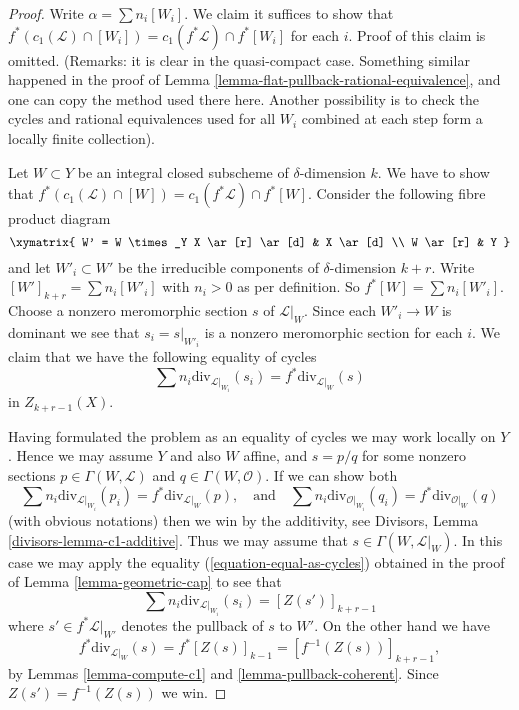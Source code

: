 \begin{proof}
Write $\alpha = \sum n_i[W_i]$. We claim it suffices to show that
$f^*(c_1(\mathcal{L}) \cap [W_i]) = c_1(f^*\mathcal{L}) \cap f^*[W_i]$
for each $i$. Proof of this claim is omitted.
(Remarks: it is clear in the quasi-compact case.
Something similar happened in the proof of
Lemma \ref{lemma-flat-pullback-rational-equivalence}, and one
can copy the method used there here. Another possibility
is to check the cycles and rational equivalences used
for all $W_i$ combined at each step form a locally finite collection).

\medskip\noindent
Let $W \subset Y$ be an integral closed subscheme of $\delta$-dimension $k$.
We have to show that
$f^*(c_1(\mathcal{L}) \cap [W]) = c_1(f^*\mathcal{L}) \cap f^*[W]$.
Consider the following fibre product diagram
$$
\xymatrix{
W' = W \times_Y X \ar[r] \ar[d] & X \ar[d] \\
W \ar[r] & Y
}
$$
and let $W'_i \subset W'$ be the irreducible components of
$\delta$-dimension $k + r$. Write
$[W']_{k + r} = \sum n_i[W'_i]$ with $n_i > 0$ as per definition.
So $f^*[W] = \sum n_i[W'_i]$. Choose a nonzero meromorphic section
$s$ of $\mathcal{L}|_W$. Since each $W'_i \to W$ is dominant we
see that $s_i = s|_{W'_i}$ is a nonzero meromorphic section for
each $i$. We claim that we have the following equality of
cycles
$$
\sum n_i\text{div}_{\mathcal{L}|_{W_i}}(s_i)
=
f^*\text{div}_{\mathcal{L}|_W}(s)
$$
in $Z_{k + r - 1}(X)$.

\medskip\noindent
Having formulated the problem as an equality of cycles
we may work locally on $Y$. Hence we may assume
$Y$ and also $W$ affine, and $s = p/q$ for some
nonzero sections $p \in \Gamma(W, \mathcal{L})$
and $q \in \Gamma(W, \mathcal{O})$. If we can show both
$$
\sum n_i\text{div}_{\mathcal{L}|_{W_i}}(p_i)
=
f^*\text{div}_{\mathcal{L}|_W}(p),
\quad\text{and}\quad
\sum n_i\text{div}_{\mathcal{O}|_{W_i}}(q_i)
=
f^*\text{div}_{\mathcal{O}|_W}(q)
$$
(with obvious notations) then we win by the
additivity, see Divisors, Lemma \ref{divisors-lemma-c1-additive}.
Thus we may assume that $s \in \Gamma(W, \mathcal{L}|_W)$.
In this case we may apply the equality
(\ref{equation-equal-as-cycles}) obtained in the proof of
Lemma \ref{lemma-geometric-cap} to see that
$$
\sum n_i\text{div}_{\mathcal{L}|_{W_i}}(s_i)
=
[Z(s')]_{k + r - 1}
$$
where $s' \in f^*\mathcal{L}|_{W'}$ denotes the pullback
of $s$ to $W'$. On the other hand we have
$$
f^*\text{div}_{\mathcal{L}|_W}(s) = f^*[Z(s)]_{k - 1}
= [f^{-1}(Z(s))]_{k + r - 1},
$$
by Lemmas \ref{lemma-compute-c1} and \ref{lemma-pullback-coherent}.
Since $Z(s') = f^{-1}(Z(s))$ we win.
\end{proof}

